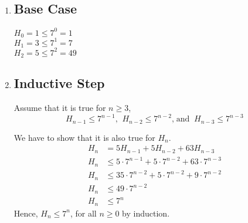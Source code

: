 \documentclass[12pt]{article}
\begin{document}
\begin{enumerate}[1)]
    \item 
        \subsection*{Base Case}
            $H_0 = 1 \leq 7^0 = 1$ \\
            $H_1 = 3 \leq 7^1 = 7$ \\
            $H_2 = 5 \leq 7^2 = 49$
    \item
        \subsection*{Inductive Step}
            Assume that it is true for $n \geq 3$, 
            $$H_{n-1} \leq 7^{n-1} \text{,} \;\;  H_{n-2} \leq 7^{n-2} \text{,} \; \text{and} \;\; H_{n-3} \leq 7^{n-3}$$
            
            We have to show that it is also true for $H_n$.
            \begin{align*}
                H_n &= 5 H_{n-1} + 5 H_{n-2} + 63 H_{n-3} \\
                H_n &\leq 5 \cdot 7^{n-1} + 5 \cdot 7^{n-2} + 63 \cdot 7^{n-3} \\
                H_n &\leq 35 \cdot 7^{n-2} + 5 \cdot 7^{n-2} + 9 \cdot 7^{n-2} \\
                H_n &\leq 49 \cdot 7^{n-2} \\
                H_n &\leq 7^n
            \end{align*}
            Hence, $H_n \leq 7^n$, for all $n \geq 0$ by induction.
\end{enumerate}{}
\end{document}
